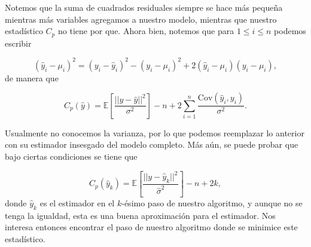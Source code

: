 \documentclass[
  letterpaper,
  DIV=11,
  numbers=noendperiod]{scrreprt}
\theoremstyle{plain}
\theoremstyle{definition}
\theoremstyle{remark}
\begin{document}
Notemos que la suma de cuadrados residuales siempre se hace más pequeña
mientras más variables agregamos a nuestro modelo, mientras que nuestro
estadístico \(C_p\) no tiene por que. Ahora bien, notemos que para
\(1\leq i\leq n\) podemos escribir

\[
(\hat y_i-\mu_i)^2=(y_i-\hat y_i)^2-(y_i-\mu_i)^2+2(\hat y_i-\mu_i)(y_i-\mu_i),
\] de manera que

\[
C_p(\hat y)=\mathbb E\left[\frac{||y-\hat y||^2}{\sigma^2}\right]-n+2\sum_{i=1}^n\frac{\text{Cov}(\hat y_i,y_i)}{\sigma^2}.
\]

Usualmente no conocemos la varianza, por lo que podemos reemplazar lo
anterior con su estimador insesgado del modelo completo. Más aún, se
puede probar que bajo ciertas condiciones se tiene que

\[
C_p(\hat y_k)=\mathbb E\left[\frac{||y-\hat y_k||^2}{\hat\sigma^2}\right]-n+2k,
\]donde \(\hat y_k\) es el estimador en el \(k\)-ésimo paso de nuestro
algoritmo, y aunque no se tenga la igualdad, esta es una buena
aproximación para el estimador. Nos interesa entonces encontrar el paso
de nuestro algoritmo donde se minimice este estadístico.
\end{document}

